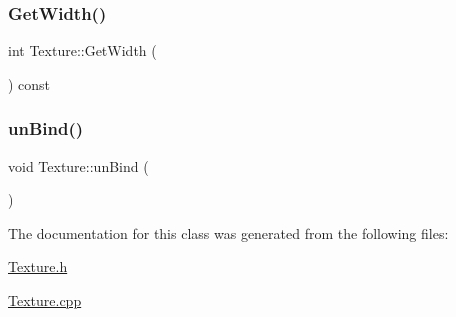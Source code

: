 \subsubsection{\texorpdfstring{Get\+Width()}{GetWidth()}}
{\footnotesize\ttfamily int Texture\+::\+Get\+Width (\begin{DoxyParamCaption}{ }\end{DoxyParamCaption}) const\hspace{0.3cm}{\ttfamily [inline]}}

\mbox{\label{class_texture_a59f83c1891b109e49b42a330b66eba16}} 
\subsubsection{\texorpdfstring{un\+Bind()}{unBind()}}
{\footnotesize\ttfamily void Texture\+::un\+Bind (\begin{DoxyParamCaption}{ }\end{DoxyParamCaption})}



The documentation for this class was generated from the following files\+:\begin{DoxyCompactItemize}
\item 
\mbox{\hyperlink{_texture_8h}{Texture.\+h}}\item 
\mbox{\hyperlink{_texture_8cpp}{Texture.\+cpp}}\end{DoxyCompactItemize}
